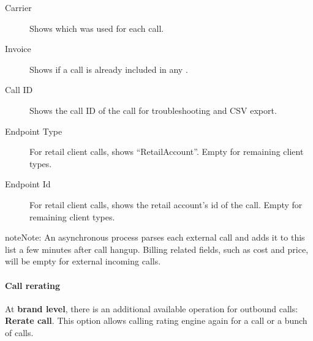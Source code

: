 \documentclass[letterpaper,10pt,english]{sphinxmanual}
\begin{document}
\begin{description}
\item[{Carrier}] \leavevmode{}\label{administration_portal/client/residential/calls/external_calls:term-carrier}
Shows which {\hyperref[administration_portal/brand/providers/carriers:carriers]{}} was used for
each call.

\item[{Invoice}] \leavevmode{}\label{administration_portal/client/residential/calls/external_calls:term-invoice}
Shows if a call is already included in any {\hyperref[administration_portal/brand/invoicing/invoices:invoices]{}}.

\item[{Call ID}] \leavevmode{}\label{administration_portal/client/residential/calls/external_calls:term-call-id}
Shows the call ID of the call for troubleshooting and CSV export.

\item[{Endpoint Type}] \leavevmode{}\label{administration_portal/client/residential/calls/external_calls:term-endpoint-type}
For retail client calls, shows ``RetailAccount''. Empty for remaining client types.

\item[{Endpoint Id}] \leavevmode{}\label{administration_portal/client/residential/calls/external_calls:term-endpoint-id}
For retail client calls, shows the retail account's id of the call. Empty for remaining client types.

\end{description}

\begin{notice}{note}{Note:}
An asynchronous process parses each external call and adds it to this list a few minutes after call hangup. Billing related fields, such as cost and price, will be empty for external incoming calls.
\end{notice}


\paragraph{Call rerating}
\label{administration_portal/client/residential/calls/external_calls:call-rerating}
At \textbf{brand level}, there is an additional available operation for outbound calls: \textbf{Rerate call}. This option allows calling rating engine again for a call or a bunch of calls.
\end{document}
